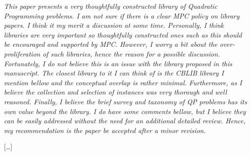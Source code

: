 \documentclass[11pt]{article}
\newcommand{\rep}[1]{{\textcolor{acblue}{#1}}}
\begin{document}
{\it
This paper presents a very thoughtfully constructed library of Quadratic Programming problems. I am not sure if there is a clear MPC policy on library
papers. I think it my merit a discussion at some time. Personally, I think libraries are very important so thoughtfully constructed ones such as this should
be encouraged and supported by MPC. However, I worry a bit about the over-
proliferation of such libraries, hence the reason for a possible discussion. Fortunately, I do not believe this is an issue with the library proposed in this
manuscript. The closest library to it I can think of is the CBLIB library I
mention bellow and the conceptual overlap is rather minimal. Furthermore, as
I believe the collection and selection of instances was very thorough and well
reasoned. Finally, I believe the brief survey and taxonomy of QP problems has
its own value beyond the library. I do have some comments bellow, but I believe
they can be easily addressed without the need for an additional detailed review.
Hence, my recommendation is the paper be accepted after a minor revision.
}

\rep{[\dots] }
\end{document}
